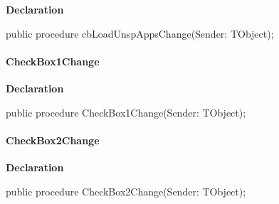 \documentclass{report}
\newif\ifpdf
\begin{document}
\label{settings.TFmConfig-cbLoadUnspAppsChange}
\begin{list}{}{
\setlength{\itemindent}{0cm}
\setlength{\listparindent}{0cm}
\setlength{\leftmargin}{\evensidemargin}
\addtolength{\leftmargin}{\tmplength}
\settowidth{\labelsep}{X}
\addtolength{\leftmargin}{\labelsep}
\setlength{\labelwidth}{\tmplength}
}
\item[\textbf{Declaration}\hfill]
\ifpdf
\begin{flushleft}
\fi
\begin{ttfamily}
public procedure cbLoadUnspAppsChange(Sender: TObject);\end{ttfamily}

\ifpdf
\end{flushleft}
\fi

\end{list}
\paragraph*{CheckBox1Change}\hspace*{\fill}

\label{settings.TFmConfig-CheckBox1Change}
\begin{list}{}{
\setlength{\itemindent}{0cm}
\setlength{\listparindent}{0cm}
\setlength{\leftmargin}{\evensidemargin}
\addtolength{\leftmargin}{\tmplength}
\settowidth{\labelsep}{X}
\addtolength{\leftmargin}{\labelsep}
\setlength{\labelwidth}{\tmplength}
}
\item[\textbf{Declaration}\hfill]
\ifpdf
\begin{flushleft}
\fi
\begin{ttfamily}
public procedure CheckBox1Change(Sender: TObject);\end{ttfamily}

\ifpdf
\end{flushleft}
\fi

\end{list}
\paragraph*{CheckBox2Change}\hspace*{\fill}

\label{settings.TFmConfig-CheckBox2Change}
\begin{list}{}{
\setlength{\itemindent}{0cm}
\setlength{\listparindent}{0cm}
\setlength{\leftmargin}{\evensidemargin}
\addtolength{\leftmargin}{\tmplength}
\settowidth{\labelsep}{X}
\addtolength{\leftmargin}{\labelsep}
\setlength{\labelwidth}{\tmplength}
}
\item[\textbf{Declaration}\hfill]
\ifpdf
\begin{flushleft}
\fi
\begin{ttfamily}
public procedure CheckBox2Change(Sender: TObject);\end{ttfamily}

\ifpdf
\end{flushleft}
\fi

\end{list}
\end{document}
